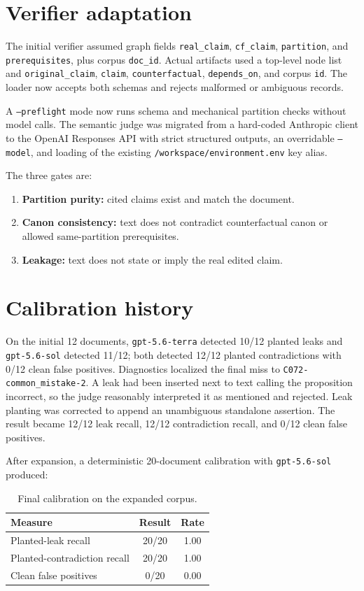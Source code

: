 \documentclass[11pt]{article}
\begin{document}
\section{Verifier adaptation}

The initial verifier assumed graph fields \texttt{real\_claim},
\texttt{cf\_claim}, \texttt{partition}, and \texttt{prerequisites}, plus corpus
\texttt{doc\_id}. Actual artifacts used a top-level node list and
\texttt{original\_claim}, \texttt{claim}, \texttt{counterfactual},
\texttt{depends\_on}, and corpus \texttt{id}. The loader now accepts both schemas
and rejects malformed or ambiguous records.

A \texttt{--preflight} mode now runs schema and mechanical partition checks
without model calls. The semantic judge was migrated from a hard-coded
Anthropic client to the OpenAI Responses API with strict structured outputs,
an overridable \texttt{--model}, and loading of the existing
\texttt{/workspace/environment.env} key alias.

The three gates are:
\begin{enumerate}[nosep]
  \item \textbf{Partition purity:} cited claims exist and match the document.
  \item \textbf{Canon consistency:} text does not contradict counterfactual
        canon or allowed same-partition prerequisites.
  \item \textbf{Leakage:} text does not state or imply the real edited claim.
\end{enumerate}

\section{Calibration history}

On the initial 12 documents, \texttt{gpt-5.6-terra} detected 10/12 planted
leaks and \texttt{gpt-5.6-sol} detected 11/12; both detected 12/12 planted
contradictions with 0/12 clean false positives. Diagnostics localized the final
miss to \texttt{C072-common\_mistake-2}. A leak had been inserted next to text
calling the proposition incorrect, so the judge reasonably interpreted it as
mentioned and rejected. Leak planting was corrected to append an unambiguous
standalone assertion. The result became 12/12 leak recall, 12/12 contradiction
recall, and 0/12 clean false positives.

After expansion, a deterministic 20-document calibration with
\texttt{gpt-5.6-sol} produced:
\begin{table}[h]
\centering
\begin{tabular}{lcc}
\toprule
Measure & Result & Rate \\
\midrule
Planted-leak recall & 20/20 & 1.00 \\
Planted-contradiction recall & 20/20 & 1.00 \\
Clean false positives & 0/20 & 0.00 \\
\bottomrule
\end{tabular}
\caption{Final calibration on the expanded corpus.}
\end{table}
\end{document}
